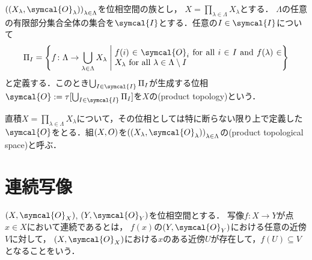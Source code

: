 \documentclass{ltjsbook}
\begin{document}
\begin{thmbox}
\begin{definition}
\({\tuple{\tuple{X_\lambda, \symcal{O}_\lambda}}}_{\lambda \in \Lambda}\)を位相空間の族とし，
\(X = \prod_{\lambda \in \Lambda} X_\lambda\)とする．
\(\Lambda\)の任意の有限部分集合全体の集合を\(\symcal{I}\)とする．任意の\(I \in \symcal{I}\)について
\begin{align*}
    \Pi_I = \left\{ f\colon \Lambda \to \bigcup_{\lambda \in \Lambda} X_\lambda \relmiddle{|} \text{\parbox{7cm}{\(f(i) \in \symcal{O}_i\) for all \(i \in I\) and \(f(\lambda) \in X_\lambda\) for all \(\lambda \in \Lambda \setminus I\)}}\right\}
\end{align*}
と定義する．このとき\(\bigcup_{I \in \symcal{I}} \Pi_I\)が生成する位相\(\symcal{O}:=\tau[\bigcup_{I \in \symcal{I}}\Pi_I]\)を\(X\)の(product topology)という．
\end{definition}
\end{thmbox}

直積\(X = \prod_{\lambda \in \Lambda} X_\lambda\)について，その位相としては特に断らない限り上で定義した\(\symcal{O}\)をとる．組\((X, O)\)を\({\tuple{\tuple{X_\lambda, \symcal{O}_\lambda}}}_{\lambda \in \Lambda}\)の(product topological space)と呼ぶ．

\section{連続写像}
\begin{thmbox}
\begin{definition}
\(\tuple{X, \symcal{O}_{X}}\), \(\tuple{Y, \symcal{O}_{Y}}\)を位相空間とする．
写像\(f\colon X \to Y\)が点\(x \in X\)において連続であるとは，
\(f(x)\)の\(\tuple{Y, \symcal{O}_{Y}}\)における任意の近傍\(V\)に対して，
\(\tuple{X, \symcal{O}_{X}}\)における\(x\)のある近傍\(U\)が存在して，\(f(U) \subseteq V\)となることをいう．
\end{definition}
\end{thmbox}
\end{document}
